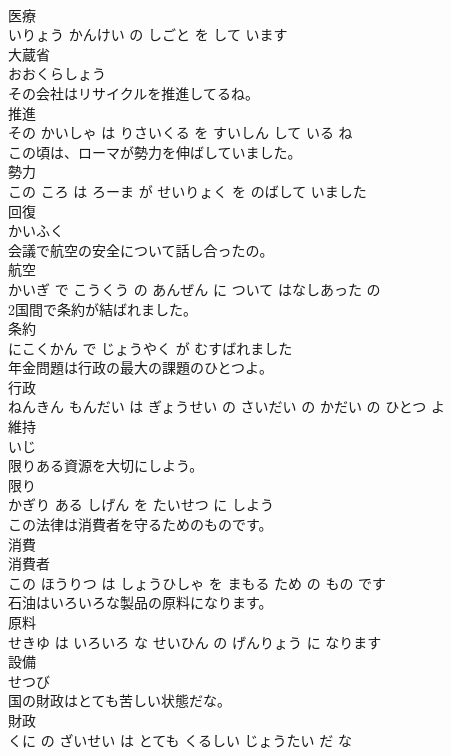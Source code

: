 \documentclass[8pt]{extreport}
\begin{document}
\begin{CJK}{UTF8}{min}
\\	医療 
\\	いりょう かんけい の しごと を して います			
\\	大蔵省	
\\	おおくらしょう			
\\	その会社はリサイクルを推進してるね。	
\\	推進 
\\	その かいしゃ は りさいくる を すいしん して いる ね			
\\	この頃は、ローマが勢力を伸ばしていました。	
\\	勢力 
\\	この ころ は ろーま が せいりょく を のばして いました			
\\	回復	
\\	かいふく			
\\	会議で航空の安全について話し合ったの。	
\\	航空 
\\	かいぎ で こうくう の あんぜん に ついて はなしあった の			
\\	2国間で条約が結ばれました。	
\\	条約 
\\	にこくかん で じょうやく が むすばれました			
\\	年金問題は行政の最大の課題のひとつよ。	
\\	行政 
\\	ねんきん もんだい は ぎょうせい の さいだい の かだい の ひとつ よ			
\\	維持	
\\	いじ			
\\	限りある資源を大切にしよう。	
\\	限り 
\\	かぎり ある しげん を たいせつ に しよう			
\\	この法律は消費者を守るためのものです。	
\\	消費 
\\	消費者 
\\	この ほうりつ は しょうひしゃ を まもる ため の もの です			
\\	石油はいろいろな製品の原料になります。	
\\	原料 
\\	せきゆ は いろいろ な せいひん の げんりょう に なります			
\\	設備	
\\	せつび			
\\	国の財政はとても苦しい状態だな。	
\\	財政 
\\	くに の ざいせい は とても くるしい じょうたい だ な			

\end{CJK}
\end{document}
